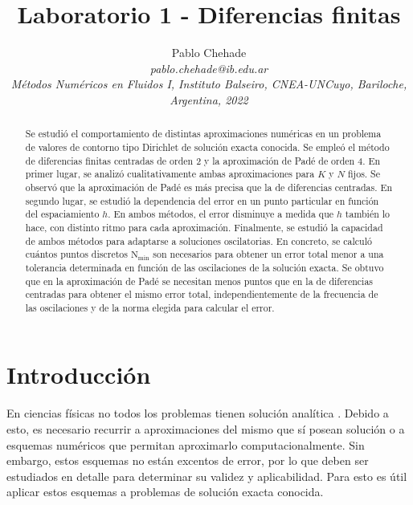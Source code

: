 \documentclass[aps,prb,twocolumn,superscriptaddress,floatfix,longbibliography]{revtex4-2}
\newif\ifptitle
\newif\ifpnumber
\newcounter{para}
\newcommand\ptitle[1]{\par\refstepcounter{para}
{\ifpnumber{\noindent\textcolor{lightgray}{\textbf{\thepara}}\indent}\fi}
{\ifptitle{\textbf{[{#1}]}}\fi}}
\begin{document}
\newcommand{\mytitle}{Laboratorio 1 - Diferencias finitas}

\title{\mytitle}

\author{Pablo Chehade \\
    \small \textit{pablo.chehade@ib.edu.ar} \\
    \small \textit{Métodos Numéricos en Fluidos I, Instituto Balseiro, CNEA-UNCuyo, Bariloche, Argentina, 2022} \\}


\begin{abstract}

Se estudió el comportamiento de distintas aproximaciones numéricas en un problema de valores de contorno tipo Dirichlet de solución exacta conocida. Se empleó el método de diferencias finitas centradas de orden 2 y la aproximación de Padé de orden 4. En primer lugar, se analizó cualitativamente ambas aproximaciones para $K$ y $N$ fijos. Se observó que la aproximación de Padé es más precisa que la de diferencias centradas. En segundo lugar, se estudió la dependencia del error en un punto particular en función del espaciamiento $h$. En ambos métodos, el error disminuye a medida que $h$ también lo hace, con distinto ritmo para cada aproximación. Finalmente, se estudió la capacidad de ambos métodos para adaptarse a soluciones oscilatorias. En concreto, se calculó cuántos puntos discretos $\mathrm{N_{min}}$ son necesarios para obtener un error total menor a una tolerancia determinada en función de las oscilaciones de la solución exacta. Se obtuvo que en la aproximación de Padé se necesitan menos puntos que en la de diferencias centradas para obtener el mismo error total, independientemente de la frecuencia de las oscilaciones y de la norma elegida para calcular el error.

\end{abstract}

\maketitle

\section{Introducción}
\ptitle{En física, no todos los problemas tienen solución analítica, muchas veces es necesario recurrir a aproximaciones}

En ciencias físicas no todos los problemas tienen solución analítica \cite{Chule}. Debido a esto, es necesario recurrir a aproximaciones del mismo que sí posean solución o a esquemas numéricos que permitan aproximarlo computacionalmente. Sin embargo, estos esquemas no están excentos de error, por lo que deben ser estudiados en detalle para determinar su validez y aplicabilidad. Para esto es útil aplicar estos esquemas a problemas de solución exacta conocida.
\end{document}
